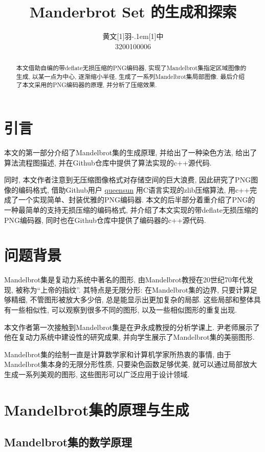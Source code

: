 \documentclass[UTF8]{ctexart}
\title{\textbf{Manderbrot Set 的生成和探索}}
\author{\CJKfamily{kai} 黄文\hbox{\scalebox{0.6}[1]{羽}\kern-.1em\scalebox{0.5}[1]{中}}\\3200100006}
\begin{document}
\maketitle

\begin{abstract}
     本文借助自编的带deflate无损压缩的PNG编码器, 实现了Mandelbrot集指定区域图像的生成, 以某一点为中心, 逐渐缩小半径, 生成了一系列Mandelbrot集局部图像. 最后介绍了本文采用的PNG编码器的原理, 并分析了压缩效果.
\end{abstract}

\section{引言}

本文的第一部分介绍了Mandelbrot集的生成原理, 并给出了一种染色方法, 给出了算法流程图描述, 并在Github仓库中提供了算法实现的c++源代码. 

同时, 本文作者注意到无压缩图像格式对存储空间的巨大浪费, 因此研究了PNG图像的编码格式, 借助Github用户 \href{https://Github.com/queensun}{queensun} 用C语言实现的zlib压缩算法, 用c++完成了一个实现简单、封装优雅的PNG编码器. 本文的后半部分着重介绍了PNG的一种最简单的支持无损压缩的编码格式, 并介绍了本文实现的带deflate无损压缩的PNG编码器, 同时也在Github仓库中提供了编码器的c++源代码. 

\section{问题背景}

Mandelbrot集是复动力系统中著名的图形, 由Mandelbrot教授在20世纪70年代发现, 被称为“上帝的指纹”. 其特点是无限分形: 在Mandelbrot集的边界, 只要计算足够精细, 不管图形被放大多少倍, 总是能显示出更加复杂的局部. 这些局部和整体具有一些相似性, 可以观察到很多不同的图形, 以及一些相似图形的重复出现. 

本文作者第一次接触到Mandelbrot集是在尹永成教授的分析学课上. 尹老师展示了他在复动力系统中建设性的研究成果, 并向学生展示了Mandelbrot集的美丽图形. 

Mandelbrot集的绘制一直是计算数学家和计算机学家所热衷的事情, 由于Mandelbrot集本身的无限分形性质, 只要染色函数足够优美, 就可以通过局部放大生成一系列美观的图形, 这些图形可以广泛应用于设计领域. 

\section{Mandelbrot集的原理与生成}

\subsection{Mandelbrot集的数学原理}
\end{document}
